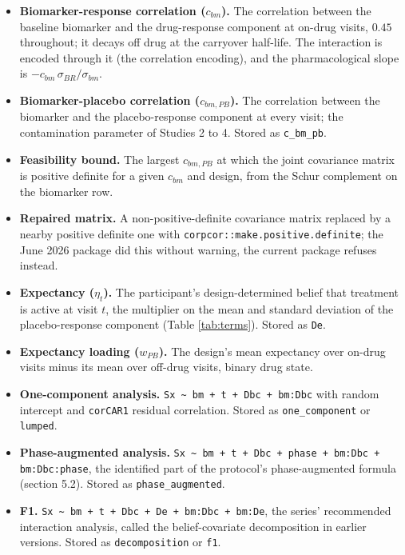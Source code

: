 \documentclass[
  11pt,
]{article}
\providecommand{\tightlist}{%
  \setlength{\itemsep}{0pt}\setlength{\parskip}{0pt}}
\begin{document}
\begin{itemize}
\tightlist
\item
  \textbf{Biomarker-response correlation (\(c_{bm}\)).} The correlation between
  the baseline biomarker and the drug-response component at on-drug
  visits, \(0.45\) throughout; it decays off drug at the carryover
  half-life. The interaction is encoded through it (the correlation
  encoding), and the pharmacological slope is \(-c_{bm}\,\sigma_{BR}/
  \sigma_{bm}\).
\item
  \textbf{Biomarker-placebo correlation (\(c_{bm,PB}\)).} The correlation
  between the biomarker and the placebo-response component at every
  visit; the contamination parameter of Studies 2 to 4. Stored as
  \texttt{c\_bm\_pb}.
\item
  \textbf{Feasibility bound.} The largest \(c_{bm,PB}\) at which the joint
  covariance matrix is positive definite for a given \(c_{bm}\) and
  design, from the Schur complement on the biomarker row.
\item
  \textbf{Repaired matrix.} A non-positive-definite covariance matrix replaced
  by a nearby positive definite one with
  \texttt{corpcor::make.positive.definite}; the June 2026 package did
  this without warning, the current package refuses instead.
\item
  \textbf{Expectancy (\(\eta_t\)).} The participant's design-determined belief
  that treatment is active at visit \(t\), the multiplier on the mean and
  standard deviation of the placebo-response component (Table
  \ref{tab:terms}). Stored as \texttt{De}.
\item
  \textbf{Expectancy loading (\(w_{PB}\)).} The design's mean expectancy over
  on-drug visits minus its mean over off-drug visits, binary drug state.
\item
  \textbf{One-component analysis.} \texttt{Sx \textasciitilde{} bm + t + Dbc +
  bm:Dbc} with random intercept and \texttt{corCAR1} residual correlation.
  Stored as \texttt{one\_component} or \texttt{lumped}.
\item
  \textbf{Phase-augmented analysis.} \texttt{Sx \textasciitilde{} bm + t + Dbc
  + phase + bm:Dbc + bm:Dbc:phase}, the identified part of the protocol's
  phase-augmented formula (section 5.2). Stored as
  \texttt{phase\_augmented}.
\item
  \textbf{F1.} \texttt{Sx \textasciitilde{} bm + t + Dbc + De + bm:Dbc +
  bm:De}, the series' recommended interaction analysis, called the
  belief-covariate decomposition in earlier versions. Stored as
  \texttt{decomposition} or \texttt{f1}.

\end{itemize}
\end{document}
